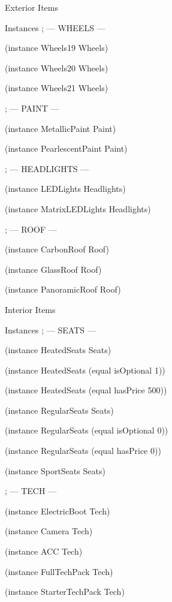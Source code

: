 \documentclass{beamer}
\begin{document}
\begin{frame}{Exterior Items}
\begin{block}{Instances}
; --- WHEELS ---
    
(instance Wheels19 Wheels)

(instance Wheels20 Wheels)

(instance Wheels21 Wheels)

; --- PAINT ---

(instance MetallicPaint Paint)

(instance PearlescentPaint Paint)

; --- HEADLIGHTS ---

(instance LEDLights Headlights)

(instance MatrixLEDLights Headlights)

; --- ROOF ---

(instance CarbonRoof Roof)

(instance GlassRoof Roof)

(instance PanoramicRoof Roof)
\end{block}

\end{frame}

\begin{frame}{Interior Items}
\begin{block}{Instances}
; --- SEATS ---

(instance HeatedSeats Seats)

(instance HeatedSeats (equal isOptional 1))

(instance HeatedSeats (equal hasPrice 500))

(instance RegularSeats Seats)

(instance RegularSeats (equal isOptional 0))

(instance RegularSeats (equal hasPrice 0))

(instance SportSeats Seats)

; --- TECH ---

(instance ElectricBoot Tech)

(instance Camera Tech)

(instance ACC Tech)

(instance FullTechPack Tech)

(instance StarterTechPack Tech)
\end{block}
\end{frame}
\end{document}
